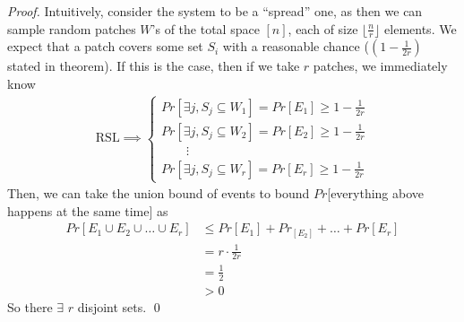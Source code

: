 \begin{proof}
	Intuitively, consider the system to be a ``spread'' one, as then we can sample random patches $W$'s of the total space $[n]$, each of size $\lfloor \frac{n}{r} \rfloor$ elements. We expect that a patch covers some set $S_i$ with a reasonable chance ($(1 - \frac{1}{2r})$ stated in theorem). If this is the case, then if we take $r$ patches, we immediately know
	\begin{align}
		\text{RSL} \implies 
		\begin{cases}
			Pr[\exists j, S_j \subseteq W_1] = Pr[E_1] \geq 1 - \frac{1}{2r} \\
			Pr[\exists j, S_j \subseteq W_2] = Pr[E_2] \geq 1 - \frac{1}{2r} \\
			\quad \quad \vdots \\
			Pr[\exists j, S_j \subseteq W_r] = Pr[E_r] \geq 1 - \frac{1}{2r} 
		\end{cases}
	\end{align}
	Then, we can take the union bound of events to bound $Pr$[everything above happens at the same time] as 
	\begin{align}
		Pr[E_1 \cup E_2 \cup \dots \cup E_r] 
		&\leq Pr[E_1] + Pr_[E_2] + \dots + Pr[E_r] \\
		&= r \cdot \frac{1}{2r} \\
		&= \frac{1}{2} \\
		&> 0
	\end{align}
	So there $\exists$ $r$ disjoint sets. \qed
\end{proof}




















































